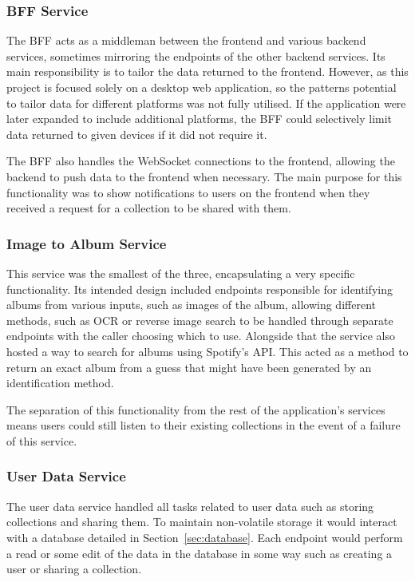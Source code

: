 \subsubsection{BFF Service}
The BFF acts as a middleman between the frontend and various backend services, sometimes mirroring the endpoints of the other backend services. Its main responsibility is to tailor the data returned to the frontend. However, as this project is focused solely on a desktop web application, so the patterns potential to tailor data for different platforms was not fully utilised. If the application were later expanded to include additional platforms, the BFF could selectively limit data returned to given devices if it did not require it.

The BFF also handles the WebSocket connections to the frontend, allowing the backend to push data to the frontend when necessary. The main purpose for this functionality was to show notifications to users on the frontend when they received a request for a collection to be shared with them.

\subsubsection{Image to Album Service}
This service was the smallest of the three, encapsulating a very specific functionality. Its intended design included endpoints responsible for identifying albums from various inputs, such as images of the album, allowing different methods, such as OCR or reverse image search to be handled through separate endpoints with the caller choosing which to use. Alongside that the service also hosted a way to search for albums using Spotify's API. This acted as a method to return an exact album from a guess that might have been generated by an identification method.

The separation of this functionality from the rest of the application’s services means users could still listen to their existing collections in the event of a failure of this service.

\subsubsection{User Data Service}
The user data service handled all tasks related to user data such as storing collections and sharing them. To maintain non-volatile storage it would interact with a database detailed in Section~\ref{sec:database}. Each endpoint would perform a read or some edit of the data in the database in some way such as creating a user or sharing a collection.

